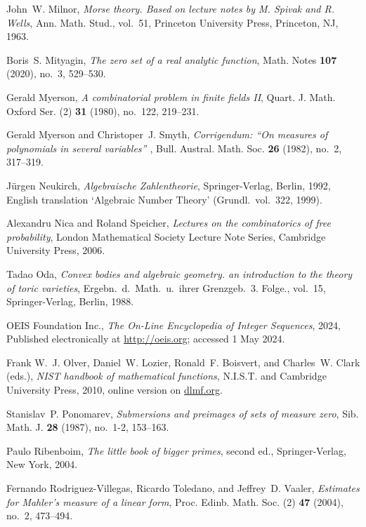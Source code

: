 \documentclass[12pt,reqno]{amsart}
\theoremstyle{definition}
\theoremstyle{plain}
\theoremstyle{definition}
\begin{document}
\begin{thebibliography}{100}
John~W. Milnor, \emph{Morse theory. {Based} on lecture notes by {M}. {Spivak}
  and {R}. {Wells}}, Ann. Math. Stud., vol.~51, Princeton University Press,
  Princeton, NJ, 1963.

Boris~S. Mityagin, \emph{The zero set of a real analytic function}, Math. Notes
  \textbf{107} (2020), no.~3, 529--530.

Gerald Myerson, \emph{A combinatorial problem in finite fields {II}}, Quart. J.
  Math. Oxford Ser. (2) \textbf{31} (1980), no.~122, 219--231.

Gerald Myerson and Christoper~J. Smyth, \emph{Corrigendum: ``{O}n measures of
  polynomials in several variables'' \cite{SmythMP}}, Bull. Austral. Math. Soc.
  \textbf{26} (1982), no.~2, 317--319.

J\"urgen Neukirch, \emph{Algebraische {Z}ahlentheorie}, Springer-Verlag,
  Berlin, 1992, English translation `{Algebraic Number Theory}' (Grundl.\ vol.\
  322, 1999).

Alexandru Nica and Roland Speicher, \emph{Lectures on the combinatorics of free
  probability}, London Mathematical Society Lecture Note Series, Cambridge
  University Press, 2006.

Tadao Oda, \emph{Convex bodies and algebraic geometry. an introduction to the
  theory of toric varieties}, Ergebn.\ d.\ Math.\ u.\ ihrer Grenzgeb.\ 3.
  Folge., vol.~15, Springer-Verlag, Berlin, 1988.

{OEIS Foundation Inc.}, \emph{The {O}n-{L}ine {E}ncyclopedia of {I}nteger
  {S}equences}, 2024, Published electronically at \url{http://oeis.org};
  accessed 1 May 2024.

Frank W.~J. Olver, Daniel~W. Lozier, Ronald~F. Boisvert, and Charles~W. Clark
  (eds.), \emph{N{IST} handbook of mathematical functions}, N.I.S.T. and
  Cambridge University Press, 2010, online version on \url{dlmf.org}.

Stanislav~P. Ponomarev, \emph{Submersions and preimages of sets of measure
  zero}, Sib. Math. J. \textbf{28} (1987), no.~1-2, 153--163.

Paulo Ribenboim, \emph{The little book of bigger primes}, second ed.,
  Springer-Verlag, New York, 2004.

Fernando Rodriguez-Villegas, Ricardo Toledano, and Jeffrey~D. Vaaler,
  \emph{Estimates for {M}ahler's measure of a linear form}, Proc. Edinb. Math.
  Soc. (2) \textbf{47} (2004), no.~2, 473--494.


\end{thebibliography}
\end{document}
